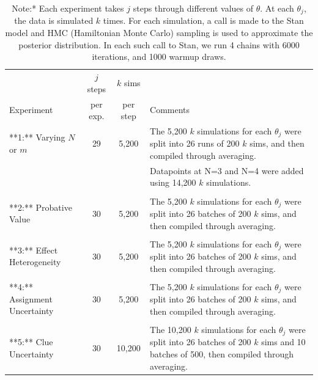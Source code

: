 \documentclass[12pt,]{book}
\begin{document}
\newpage

\normalsize

\begin{table}
\footnotesize
\centering
\begin{tabular}{lccp{8cm}} 
                        & $j$ steps             & $k$ sims                  &                   \\ 
Experiment              & per exp.              & per step                  & Comments                  \\ \hline
**1:**
Varying $N$ or $m$      & 29                    & 5,200                             & The 5,200 $k$ simulations for each $\theta_j$ were split into 26 runs of 200 $k$ sims, and then
                                                                                      compiled through averaging. \\
                                                                                     
&&&                 Datapoints at N=3 and N=4 were added using 14,200 $k$ simulations. \\\\
**2:**
Probative Value         & 30                    & 5,200                             & The 5,200 $k$ simulations for each $\theta_j$ were split into 26 batches of 200 $k$ sims, and then
                                                                                      compiled through averaging.  \\ \\
**3:**
Effect Heterogeneity    & 30                    & 5,200                             & The 5,200 $k$ simulations for each $\theta_j$ were split into 26 batches of 200 $k$ sims, and then
                                                                                      compiled through averaging.  \\ \\
**4:**
Assignment Uncertainty  & 30                    & 5,200                             & The 5,200 $k$ simulations for each $\theta_j$ were split into 26 batches of 200 $k$ sims, and then
                                                                                      compiled through averaging.  \\ \\
**5:**
Clue Uncertainty        & 30                    & 10,200                            & The 10,200 $k$ simulations for each $\theta_j$ were split into 26 batches of 200 $k$ sims and 
                                                                                      10 batches of 500, then
                                                                                      compiled through averaging.  \\
\end{tabular}
\caption{\footnotesize *Note:* 
Each experiment takes $j$ steps through different values of $\theta$. At each $\theta_j$, the data is simulated $k$ times. For each simulation,   
a call is made to the Stan model and HMC (Hamiltonian Monte Carlo) sampling is used
to approximate the posterior distribution. 
In each such call to Stan, we run 4 chains with 6000 iterations, and 
1000 warmup draws.}
\label{simdetails}
\end{table}
\end{document}
